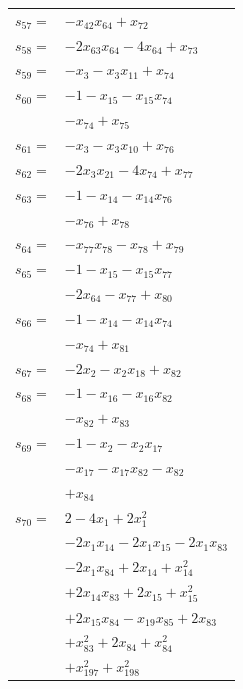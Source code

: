 \begin{longtable}{@{}r@{\;}l@{}}
\(s_{57}=\) & \(\displaystyle -x_{42}x_{64} +x_{72}\) \\[3pt]
\(s_{58}=\) & \(\displaystyle -2x_{63}x_{64} -4x_{64} +x_{73}\) \\[3pt]
\(s_{59}=\) & \(\displaystyle -x_{3} -x_{3}x_{11} +x_{74}\) \\[3pt]
\(s_{60}=\) & \(\displaystyle -1 -x_{15} -x_{15}x_{74}\) \\
 & \(\displaystyle -x_{74} +x_{75}\) \\[3pt]
\(s_{61}=\) & \(\displaystyle -x_{3} -x_{3}x_{10} +x_{76}\) \\[3pt]
\(s_{62}=\) & \(\displaystyle -2x_{3}x_{21} -4x_{74} +x_{77}\) \\[3pt]
\(s_{63}=\) & \(\displaystyle -1 -x_{14} -x_{14}x_{76}\) \\
 & \(\displaystyle -x_{76} +x_{78}\) \\[3pt]
\(s_{64}=\) & \(\displaystyle -x_{77}x_{78} -x_{78} +x_{79}\) \\[3pt]
\(s_{65}=\) & \(\displaystyle -1 -x_{15} -x_{15}x_{77}\) \\
 & \(\displaystyle -2x_{64} -x_{77} +x_{80}\) \\[3pt]
\(s_{66}=\) & \(\displaystyle -1 -x_{14} -x_{14}x_{74}\) \\
 & \(\displaystyle -x_{74} +x_{81}\) \\[3pt]
\(s_{67}=\) & \(\displaystyle -2x_{2} -x_{2}x_{18} +x_{82}\) \\[3pt]
\(s_{68}=\) & \(\displaystyle -1 -x_{16} -x_{16}x_{82}\) \\
 & \(\displaystyle -x_{82} +x_{83}\) \\[3pt]
\(s_{69}=\) & \(\displaystyle -1 -x_{2} -x_{2}x_{17}\) \\
 & \(\displaystyle -x_{17} -x_{17}x_{82} -x_{82}\) \\
 & \(\displaystyle +x_{84}\) \\[3pt]
\(s_{70}=\) & \(\displaystyle 2 -4x_{1} +2x_{1}^{2}\) \\
 & \(\displaystyle -2x_{1}x_{14} -2x_{1}x_{15} -2x_{1}x_{83}\) \\
 & \(\displaystyle -2x_{1}x_{84} +2x_{14} +x_{14}^{2}\) \\
 & \(\displaystyle +2x_{14}x_{83} +2x_{15} +x_{15}^{2}\) \\
 & \(\displaystyle +2x_{15}x_{84} -x_{19}x_{85} +2x_{83}\) \\
 & \(\displaystyle +x_{83}^{2} +2x_{84} +x_{84}^{2}\) \\
 & \(\displaystyle +x_{197}^{2} +x_{198}^{2}\) \\[3pt]

\end{longtable}
